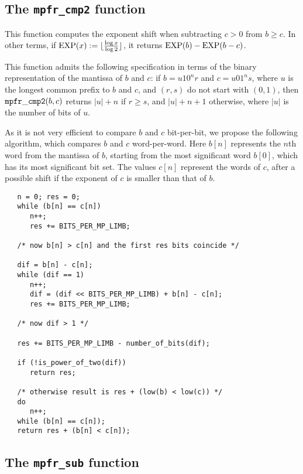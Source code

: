 \documentclass[12pt]{amsart}
\begin{document}
\subsection{The {\tt mpfr\_cmp2} function}

This function computes the exponent shift when subtracting $c > 0$ from
$b \ge c$. In other terms, if ${\rm EXP}(x) :=
\lfloor \frac{\log x}{\log 2} \rfloor$,
it returns ${\rm EXP}(b) - {\rm EXP}(b-c)$.

This function admits the following specification in terms of the binary
representation of the mantissa of $b$ and $c$: if $b = u 1 0^n r$ and
$c = u 0 1^n s$, where $u$ is the longest common prefix to $b$ and $c$,
and $(r,s)$ do not start with $(0, 1)$, then ${\tt mpfr\_cmp2}(b,c)$ returns
$|u| + n$ if $r \ge s$, and $|u| + n + 1$ otherwise, where $|u|$ is the number
of bits of $u$.

As it is not very efficient to compare $b$ and $c$ bit-per-bit, we propose
the following algorithm, which compares $b$ and $c$ word-per-word.
Here $b[n]$ represents the $n$th word from the mantissa of $b$, starting from
the most significant word $b[0]$, which has its most significant bit set.
The values $c[n]$ represent the words of $c$, after a possible shift if the
exponent of $c$ is smaller than that of $b$.
\begin{verbatim}
   n = 0; res = 0;
   while (b[n] == c[n])
      n++;
      res += BITS_PER_MP_LIMB;

   /* now b[n] > c[n] and the first res bits coincide */

   dif = b[n] - c[n];
   while (dif == 1)
      n++;
      dif = (dif << BITS_PER_MP_LIMB) + b[n] - c[n];
      res += BITS_PER_MP_LIMB;

   /* now dif > 1 */

   res += BITS_PER_MP_LIMB - number_of_bits(dif);

   if (!is_power_of_two(dif))
      return res;

   /* otherwise result is res + (low(b) < low(c)) */
   do
      n++;
   while (b[n] == c[n]);
   return res + (b[n] < c[n]);
\end{verbatim}

\subsection{The {\tt mpfr\_sub} function}
\end{document}
